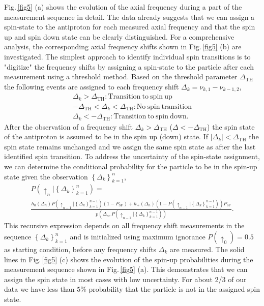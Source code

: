 \documentclass[12pt,preprint%
]{elsarticle}
\begin{document}
Fig.$\,$\ref{fig5} (a) shows the evolution of the axial frequency during a part of the measurement sequence in detail. 
The data already suggests that we can assign a spin-state to the antiproton for each measured axial frequency and that the spin up and spin down state can be clearly distinguished. For a comprehensive analysis, the corresponding axial frequency shifts shown in Fig.$\,$\ref{fig5} (b) are investigated. The simplest approach to identify individual spin transitions is to "digitize" the frequency shifts by assigning a spin-state to the particle after each measurement using a threshold method. Based on the threshold parameter $\Delta_{\mathrm{TH}}$ the following events are assigned to each frequency shift $\Delta_k=\nu_{k,1}-\nu_{k-1,2}$,
\begin{eqnarray}
\Delta_k > \Delta_{\mathrm{TH}}: \mathrm{Transition\ to\ spin\ up}\nonumber\\
- \Delta_{\mathrm{TH}} < \Delta_k < \Delta_{\mathrm{TH}}: \mathrm{No\ spin\ transition} 
\label{thcond} \\
\Delta_k < -\Delta_{\mathrm{TH}}: \mathrm{Transition\ to\ spin\ down}.\nonumber
\end{eqnarray}
After the observation of a frequency shift $\Delta_k>\Delta_{\mathrm{TH}}$ ($\Delta<-\Delta_{\mathrm{TH}}$) the spin state of the antiproton is assumed to be in the spin up (down) state. If $|\Delta_k|<\Delta_{\mathrm{TH}}$ the spin state remains unchanged and we assign the same spin state as after the last identified spin transition. To address the uncertainty of the spin-state assignment, we can determine the conditional probability for the particle to be in the spin-up state given the observation $\left\{\Delta_k\right\}_{k=1}^{n}$,
\begin{multline}
P(\uparrow_n|\left\{\Delta_k\right\}_{k=1}^{n}) = \\ 
\frac{h_0(\Delta_n) P(\uparrow_{n-1}|\left\{\Delta_k\right\}_{k=1}^{n-1})(1-P_\mathrm{SF})+h_+(\Delta_n) (1-P(\uparrow_{n-1}|\left\{\Delta_k\right\}_{k=1}^{n-1})) P_\mathrm{SF}}{p(\Delta_n,P(\uparrow_{n-1}|\left\{\Delta_k\right\}_{k=1}^{n-1}))}.
\end{multline}
This recursive expression depends on all frequency shift measurements in the sequence $\left\{\Delta_k\right\}_{k=1}^{n}$ and is initialized using maximum ignorance $P(\uparrow_0) = 0.5$ as starting condition, before any frequency shifts $\Delta_k$ are measured. The solid lines in Fig.$\,$\ref{fig5} (c) shows the evolution of the spin-up probabilities during the measurement sequence shown in Fig.$\,$\ref{fig5} (a). This demonstrates that we can assign the spin state in most cases with low uncertainty. For about 2/3 of our data we have less than $5\%$ probability that the particle is not in the assigned spin state.
\end{document}

